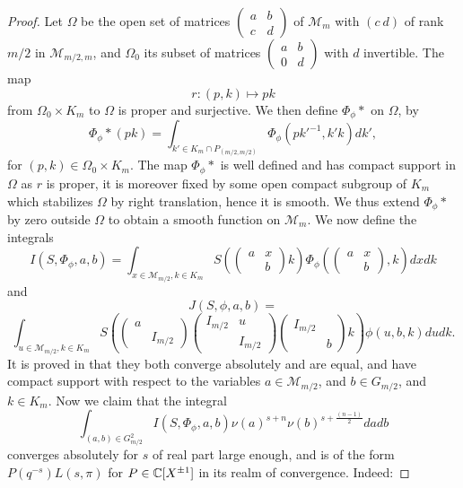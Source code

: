 \documentclass[11pt,letterpaper]{amsart}
\newcommand{\CM}{{\mathcal {M}}} \newcommand{\CN}{{\mathcal {N}}}\newcommand{\CO}{{\mathcal {O}}}\newcommand{\CP}{{\mathcal {P}}}
\theoremstyle{plain}
\numberwithin{equation}{section}
\begin{document}
\begin{proof}
Let $\Omega$ be the open set of matrices $\begin{pmatrix} a & b \\ c & d \end{pmatrix}$ of $\mathcal{M}_m$ with $(c \ d)$ of rank $m/2$ 
in $\mathcal{M}_{m/2,m}$, and $\Omega_0$ its subset of matrices $\begin{pmatrix} a & b \\ 0 & d\end{pmatrix}$ with $d$ invertible. The map 
\[r:(p,k)\mapsto pk\] from $\Omega_0\times K_m$ to $\Omega$ is proper and surjective.
We then define $\Phi_{\phi}*$ on $\Omega$, by 
\[\Phi_{\phi}*(pk)=\int_{k'\in K_m\cap P_{(m/2,m/2)}} \Phi_{\phi}(pk'^{-1},k' k)dk',\] 
for $(p,k)\in \Omega_0\times K_m$. The map $\Phi_{\phi}*$ is well defined and has compact support in $\Omega$ as $r$ is proper, it is moreover fixed by some open compact subgroup of $K_m$ which stabilizes $\Omega$ by right translation, hence it is smooth. We thus extend $\Phi_{\phi}*$ by zero outside $\Omega$ to obtain a smooth function on $\CM_m$. We now define the integrals 
\[I(S,\Phi_{\phi},a,b)=\int_{x\in \mathcal{M}_{m/2},k\in K_m}S\left(\begin{pmatrix} a & x \\ & b \end{pmatrix} k\right)
\Phi_{\phi}\left(\begin{pmatrix} a & x \\ & b \end{pmatrix},k\right)dx dk\] and 
\[J(S,\phi,a,b)=\]
\[\int_{u\in \mathcal{M}_{m/2},k\in K_m}S\left(\begin{pmatrix} a &  \\ & I_{m/2} \end{pmatrix}\begin{pmatrix} I_{m/2} & u \\ & I_{m/2} 
\end{pmatrix}\begin{pmatrix} I_{m/2} &   \\ & b \end{pmatrix} k\right)\phi(u,b,k)du dk.\] It is proved in \cite[Lemma 4.3]{MatJNT} that they both converge absolutely and are equal, and have compact support with respect to the variables 
$a\in \mathcal{M}_{m/2}$, and $b\in G_{m/2}$, and $k\in K_m$. Now we claim that the integral 
\[\int_{(a,b)\in G_{m/2}^2}I(S,\Phi_{\phi},a,b) \nu(a)^{s+n}\nu(b)^{s+\frac{(n-1)}{2}} da db\] converges absolutely for $s$ of real part large enough, and is of the form $P(q^{-s})L(s,\pi)$ for $P\in {\mathbb {C}}[X^{\pm 1}]$ in its realm of convergence. Indeed: 

\end{proof}
\end{document}
